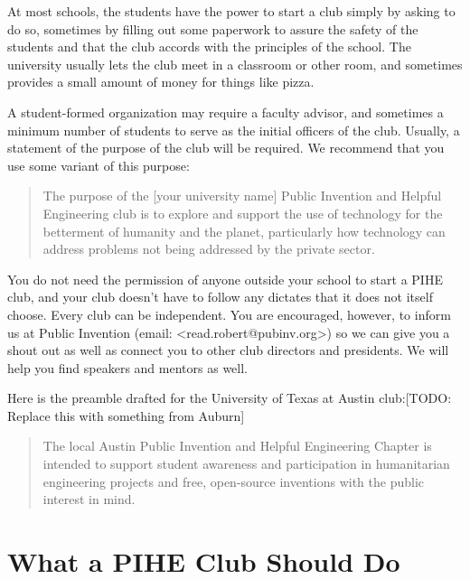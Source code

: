 \documentclass[
	fontsize=10pt, %
	twoside=false, %
	secnumdepth=1, %
]{kaobook}
\begin{document}
At most schools, the students have the power to start a club simply by
asking to do so, sometimes by filling out some paperwork to assure the
safety of the students and that the club accords with the principles
of the school. The university usually lets the club meet in a
classroom or other room, and sometimes provides a small amount of
money for things like pizza.

A student-formed organization may require a faculty advisor, and
sometimes a minimum number of students to serve as the initial
officers of the club. Usually, a statement of the purpose of the club
will be required. We recommend that you use some variant of this
purpose:

\blockquote{
The purpose of the [your university name] Public Invention and Helpful Engineering club is to explore and support the use of technology for the betterment of humanity and the planet, particularly how technology can address problems not being addressed by the private sector.
}

You do not need the permission of anyone outside your school to start a PIHE club, and your club doesn’t have to follow any dictates that it does not itself choose. Every club can be independent. You are encouraged, however, to inform us at Public Invention (email: <read.robert@pubinv.org>)  so we can give you a shout out as well as connect you to other club directors and presidents. We will help you find speakers and mentors as well.

Here is the preamble drafted for the University of Texas at Austin club:[TODO: Replace this with something from Auburn]
\blockquote{
The local Austin Public Invention and Helpful Engineering Chapter is intended to support student awareness and participation in humanitarian engineering projects and free, open-source inventions with the public interest in mind.
}

\section{What a PIHE Club Should Do}
\end{document}
